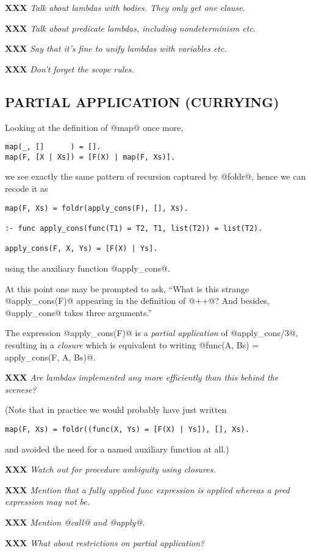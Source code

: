 \documentclass[a4paper,11pt,notitlepage,onecolumn]{article}
\newcommand{\XXX}[1]%
{{\small\textbf{XXX} \emph{#1}}}
\begin{document}
\XXX{Talk about lambdas with bodies.  They only get one clause.}

\XXX{Talk about predicate lambdas, including nondeterminism etc.}

\XXX{Say that it's fine to unify lambdas with variables etc.}

\XXX{Don't forget the scope rules.}

\subsection{PARTIAL APPLICATION (CURRYING)}

Looking at the definition of @map@ once more,
\begin{verbatim}
map(_, []      ) = [].
map(F, [X | Xs]) = [F(X) | map(F, Xs)].
\end{verbatim}
we see exactly the same pattern of recursion captured by @foldr@, hence
we can recode it as
\begin{verbatim}
map(F, Xs) = foldr(apply_cons(F), [], Xs).

:- func apply_cons(func(T1) = T2, T1, list(T2)) = list(T2).

apply_cons(F, X, Ys) = [F(X) | Ys].
\end{verbatim}
using the auxiliary function @apply_cons@.  

At this point one may be prompted to ask, ``What is this strange
@apply_cons(F)@ appearing in the definition of @++@?  And besides,
@apply_cons@ takes three arguments.''

The expression @apply_cons(F)@ is a \emph{partial application} of
@apply_cons/3@, resulting in a \emph{closure} which is equivalent to
writing @func(A, Bs) = apply_cons(F, A, Bs)@.

\XXX{Are lambdas implemented any more efficiently than this behind the
scenese?}

(Note that in practice we would probably have just written
\begin{verbatim}
map(F, Xs) = foldr((func(X, Ys) = [F(X) | Ys]), [], Xs).
\end{verbatim}
and avoided the need for a named auxiliary function at all.)

\XXX{Watch out for procedure ambiguity using closures.}

\XXX{Mention that a fully applied func expression is applied whereas a
pred expression may not be.}

\XXX{Mention @call@ and @apply@.}

\XXX{What about restrictions on partial application?}
\end{document}
